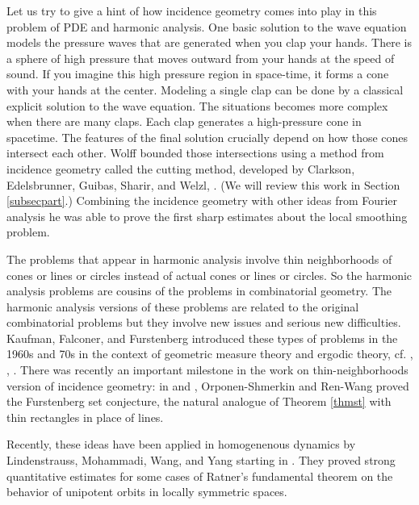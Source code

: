 \documentclass{amsart}
\begin{document}
Let us try to give a hint of how incidence geometry comes into play in this problem of PDE and harmonic analysis.   One basic solution to the wave equation models the pressure waves that are generated when you clap your hands.   There is a sphere of high pressure that moves outward from your hands at the speed of sound.  If you imagine this high pressure region in space-time,  it forms a cone with your hands at the center.   Modeling a single clap can be done by a classical explicit solution to the wave equation.   The situations becomes more complex when there are many claps.   Each clap generates a high-pressure cone in spacetime.   The features of the final solution crucially depend on how those cones intersect each other.   Wolff bounded those intersections using a method from incidence geometry called the cutting method,  developed by Clarkson, Edelsbrunner, Guibas, Sharir, and Welzl,  \cite{CEGSW}.  (We will review this work in Section \ref{subsecpart}.)   Combining the incidence geometry with other ideas from Fourier analysis he was able to prove the first sharp estimates about the local smoothing problem.

The problems that appear in harmonic analysis involve thin neighborhoods of cones or lines or circles instead of actual cones or lines or circles.   So the harmonic analysis problems are cousins of the problems in combinatorial geometry.   The harmonic analysis versions of these problems are related to the original combinatorial problems but they involve new issues and serious new difficulties.   Kaufman,  Falconer, and Furstenberg introduced these types of problems in the 1960s and 70s in the context of geometric measure theory and ergodic theory, cf. \cite{Ka},  \cite{Fa},  \cite{Wol}.   There was recently an important milestone in the work on thin-neighborhoods version of incidence geometry: in \cite{OS} and \cite{RW},  Orponen-Shmerkin and Ren-Wang proved the Furstenberg set conjecture,  the natural analogue of Theorem \ref{thmst} with thin rectangles in place of lines.

Recently,  these ideas have been applied in homogenenous dynamics by Lindenstrauss,  Mohammadi, Wang, and Yang starting in \cite{LM}.  They proved strong quantitative estimates for some cases of Ratner's fundamental theorem on the behavior of unipotent orbits in locally symmetric spaces.   
\end{document}
